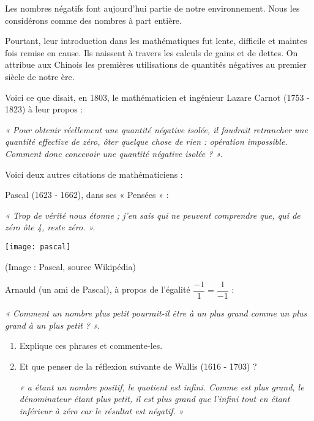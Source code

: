\begin{enigme}
Les nombres négatifs font aujourd'hui partie de notre environnement. Nous les considérons comme des nombres à part entière.

Pourtant, leur introduction dans les mathématiques fut lente, difficile et maintes fois remise en cause. Ils naissent à travers les calculs de gains et de dettes. On attribue aux Chinois les premières utilisations de quantités négatives au premier siècle de notre ère.

\vspace{1em}


Voici ce que disait, en 1803, le mathématicien et ingénieur Lazare Carnot (1753 - 1823) à leur propos :

{\em « Pour obtenir réellement une quantité négative isolée, il faudrait retrancher une quantité effective de zéro, ôter quelque chose de rien : opération impossible. Comment donc concevoir une quantité négative isolée ? ».}

\vspace{1em}

Voici deux autres citations de mathématiciens :

\vspace{1em}

Pascal (1623 - 1662), dans ses « Pensées » :

{\em « Trop de vérité nous étonne ; j’en sais qui ne peuvent comprendre que, qui de zéro ôte 4, reste zéro. ».}

\begin{center}
    \texttt{[image: pascal]}
    
\hfill {\footnotesize (Image : Pascal, source Wikipédia)}
\end{center}


\vspace{1em}

Arnauld (un ami de Pascal), à propos de l’égalité $\dfrac{-1}{1}=\dfrac{1}{-1}$ :

{\em « Comment un nombre plus petit pourrait-il être à un plus grand comme un plus grand à un plus petit ? ».}

\begin{enumerate}
    \item Explique ces phrases et commente-les.
    \item Et que penser de la réflexion suivante de Wallis (1616 - 1703) ?
    
{\em « a étant un nombre positif, le quotient  est infini. Comme  est plus grand, le dénominateur étant plus petit, il est plus grand que l’infini tout en étant inférieur à zéro car le résultat est négatif. »}
\end{enumerate}

\end{enigme} 

